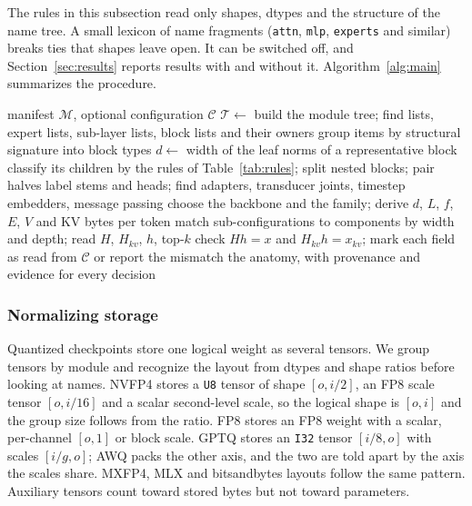 \documentclass[11pt]{article}
\newcommand{\tn}[1]{\texttt{#1}}
\begin{document}
The rules in this subsection read only shapes, dtypes and the structure of the name tree. A small lexicon of name fragments (\tn{attn}, \tn{mlp}, \tn{experts} and similar) breaks ties that shapes leave open. It can be switched off, and Section~\ref{sec:results} reports results with and without it. Algorithm~\ref{alg:main} summarizes the procedure.

\begin{algorithm}[t]
\caption{Manifest-only anatomy recovery with configuration fusion}
\label{alg:main}
\small
\begin{algorithmic}[1]
\Require manifest $\mathcal{M}$, optional configuration $\mathcal{C}$
\State $\mathcal{T}\gets$  
\State build the module tree; find lists, expert lists, sub-layer lists, block lists and their owners
  \State group items by structural signature into block types
    \State $d\gets$ width of the leaf norms of a representative block
    \State classify its children by the rules of Table~\ref{tab:rules}; split nested blocks; pair halves
  \EndFor
\EndFor
\State label stems and heads; find adapters, transducer joints, timestep embedders, message passing
\State choose the backbone and the family; derive $d$, $L$, $f$, $E$, $V$ and KV bytes per token
  \State match sub-configurations to components by width and depth; read $H$, $H_{kv}$, $h$, top-$k$
  \State check $Hh=x$ and $H_{kv}h=x_{kv}$; mark each field as read from $\mathcal{C}$ or report the mismatch
\EndIf
\State \Return the anatomy, with provenance and evidence for every decision
\end{algorithmic}
\end{algorithm}

\subsubsection{Normalizing storage}
Quantized checkpoints store one logical weight as several tensors. We group tensors by module and recognize the layout from dtypes and shape ratios before looking at names. NVFP4 stores a \tn{U8} tensor of shape $[o, i/2]$, an FP8 scale tensor $[o, i/16]$ and a scalar second-level scale, so the logical shape is $[o, i]$ and the group size follows from the ratio. FP8 stores an FP8 weight with a scalar, per-channel $[o,1]$ or block scale. GPTQ stores an \tn{I32} tensor $[i/8, o]$ with scales $[i/g, o]$; AWQ packs the other axis, and the two are told apart by the axis the scales share. MXFP4, MLX and bitsandbytes layouts follow the same pattern. Auxiliary tensors count toward stored bytes but not toward parameters.
\end{document}
